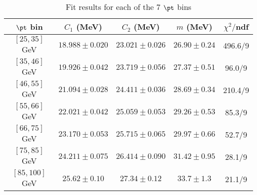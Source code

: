 \begin{table}[h!]
\centering
\begin{tabular}{c||c|c|c||c}
$\pt$ bin & $C_1$ (MeV) & $C_2$ (MeV) & $m$ (MeV) & $\chi^2/$ndf \\
\hline
$[25, 35]$ GeV & $18.988\pm0.020$ & $23.021\pm0.026$ & $26.90\pm0.24$ & 496.6/9\\
$[35, 46]$ GeV & $19.926\pm0.042$ & $23.719\pm0.056$ & $27.37\pm0.51$ & 96.0/9\\
$[46, 55]$ GeV & $21.094\pm0.028$ & $24.411\pm0.036$ & $28.69\pm0.34$ & 210.4/9\\
$[55, 66]$ GeV & $22.021\pm0.042$ & $25.059\pm0.053$ & $29.26\pm0.53$ & 85.3/9\\
$[66, 75]$ GeV & $23.170\pm0.053$ & $25.715\pm0.065$ & $29.97\pm0.66$ & 52.7/9\\
$[75, 85]$ GeV & $24.211\pm0.075$ & $26.414\pm0.090$ & $31.42\pm0.95$ & 28.1/9\\
$[85, 100]$ GeV & $25.62\pm0.10$ & $27.34\pm0.12$ & $33.7\pm1.3$ & 21.1/9\\
\end{tabular}
\caption{Fit results for each of the 7 $\pt$ bins}
\label{t:fit}
\end{table}
